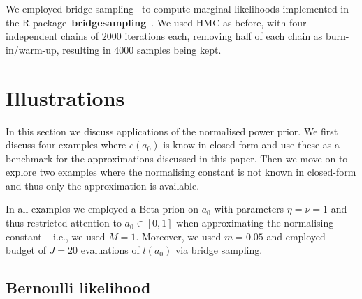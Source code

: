 \documentclass[a4paper, notitlepage, 11pt]{article}
\begin{document}
We employed bridge sampling~\citep{CITA} to compute marginal likelihoods implemented in the R package~\textbf{bridgesampling}~\citep{Gronau2017}.
We used HMC as before, with four independent chains of $2000$ iterations each, removing half of each chain as burn-in/warm-up, resulting in $4000$ samples being kept.

\section{Illustrations}
\label{sec:illustrations}

In this section we discuss applications of the normalised power prior.
We first discuss four examples where $c(a_0)$ is know in closed-form and use these as a benchmark for the approximations discussed in this paper.
Then we move on to explore two examples where the normalising constant is not known in closed-form and thus only the approximation is available.  

In all examples we employed a Beta prion on $a_0$ with parameters $\eta = \nu = 1$ and thus restricted attention to $a_0 \in [0, 1]$ when approximating the normalising constant -- i.e., we used $M = 1$.
Moreover, we used $m = 0.05$ and employed budget of $J = 20$ evaluations of $l(a_0)$ via bridge sampling.   

\subsection{Bernoulli likelihood}
\label{sec:reproduce_N2009}
\end{document}
